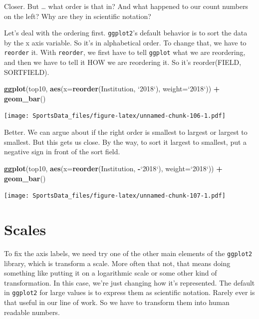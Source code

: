 \documentclass[]{book}
\newenvironment{Shaded}{\begin{snugshade}}{\end{snugshade}}
\newcommand{\DataTypeTok}[1]{\textcolor[rgb]{0.13,0.29,0.53}{#1}}
\newcommand{\KeywordTok}[1]{\textcolor[rgb]{0.13,0.29,0.53}{\textbf{#1}}}
\newcommand{\NormalTok}[1]{#1}
\newcommand{\OperatorTok}[1]{\textcolor[rgb]{0.81,0.36,0.00}{\textbf{#1}}}
\newcommand{\StringTok}[1]{\textcolor[rgb]{0.31,0.60,0.02}{#1}}
\begin{document}
Closer. But \ldots{} what order is that in? And what happened to our count numbers on the left? Why are they in scientific notation?

Let's deal with the ordering first. \texttt{ggplot2}'s default behavior is to sort the data by the x axis variable. So it's in alphabetical order. To change that, we have to \texttt{reorder} it. With \texttt{reorder}, we first have to tell \texttt{ggplot} what we are reordering, and then we have to tell it HOW we are reordering it. So it's reorder(FIELD, SORTFIELD).

\begin{Shaded}
\begin{Highlighting}[]
\KeywordTok{ggplot}\NormalTok{(top10, }\KeywordTok{aes}\NormalTok{(}\DataTypeTok{x=}\KeywordTok{reorder}\NormalTok{(Institution, }\StringTok{`}\DataTypeTok{2018}\StringTok{`}\NormalTok{), }\DataTypeTok{weight=}\StringTok{`}\DataTypeTok{2018}\StringTok{`}\NormalTok{)) }\OperatorTok{+}\StringTok{ }\KeywordTok{geom_bar}\NormalTok{()}
\end{Highlighting}
\end{Shaded}

\texttt{[image: SportsData\_files/figure-latex/unnamed-chunk-106-1.pdf]}

Better. We can argue about if the right order is smallest to largest or largest to smallest. But this gets us close. By the way, to sort it largest to smallest, put a negative sign in front of the sort field.

\begin{Shaded}
\begin{Highlighting}[]
\KeywordTok{ggplot}\NormalTok{(top10, }\KeywordTok{aes}\NormalTok{(}\DataTypeTok{x=}\KeywordTok{reorder}\NormalTok{(Institution, }\OperatorTok{-}\StringTok{`}\DataTypeTok{2018}\StringTok{`}\NormalTok{), }\DataTypeTok{weight=}\StringTok{`}\DataTypeTok{2018}\StringTok{`}\NormalTok{)) }\OperatorTok{+}\StringTok{ }\KeywordTok{geom_bar}\NormalTok{()}
\end{Highlighting}
\end{Shaded}

\texttt{[image: SportsData\_files/figure-latex/unnamed-chunk-107-1.pdf]}

\hypertarget{scales}{%
\section{Scales}\label{scales}}

To fix the axis labels, we need try one of the other main elements of the \texttt{ggplot2} library, which is transform a scale. More often that not, that means doing something like putting it on a logarithmic scale or some other kind of transformation. In this case, we're just changing how it's represented. The default in \texttt{ggplot2} for large values is to express them as scientific notation. Rarely ever is that useful in our line of work. So we have to transform them into human readable numbers.
\end{document}
